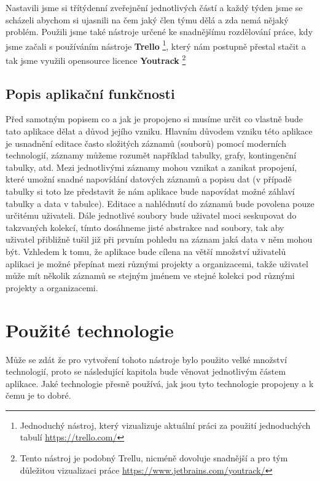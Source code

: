 \par Nastavili jsme si třítýdenní zveřejnění jednotlivých částí a každý týden jsme se scházeli abychom si ujasnili na čem jaký člen týmu dělá a zda nemá nějaký problém. Použili jsme také nástroje určené ke snadnějšímu rozdělování práce, kdy jsme začali s používáním nástroje \textbf{Trello} \footnote{Jednoduchý nástroj, který vizualizuje aktuální práci za použití jednoduchých tabulí \url{https://trello.com/}}, který nám postupně přestal stačit a tak jsme využili opensource licence \textbf{Youtrack} \footnote{Tento nástroj je podobný Trellu, nicméně dovoluje snadnější a pro tým důležitou vizualizaci práce \url{https://www.jetbrains.com/youtrack/}}

\subsection{Popis aplikační funkčnosti}
\par Před samotným popisem co a jak je propojeno si musíme určit co vlastně bude tato aplikace dělat a důvod jejího vzniku. Hlavním důvodem vzniku této aplikace je usnadnění editace často složitých záznamů (souborů) pomocí moderních technologií, záznamy můžeme rozumět například tabulky, grafy, kontingenční tabulky, atd. Mezi jednotlivými záznamy mohou vznikat a zanikat propojení, které umožní snadné napovídání datových záznamů a popisu dat (v případě tabulky si toto lze představit že nám aplikace bude napovídat možné záhlaví tabulky a data v tabulce). Editace a nahlédnutí do záznamů bude povolena pouze určitému uživateli. Dále jednotlivé soubory bude uživatel moci seskupovat do takzvaných kolekcí, tímto dosáhneme jisté abstrakce nad soubory, tak aby uživatel přibližně tušil již při prvním pohledu na záznam jaká data v něm mohou být. Vzhledem k tomu, že aplikace bude cílena na větší množství uživatelů aplikaci je možné přepínat mezi různými projekty a organizacemi, takže uživatel může mít několik záznamů se stejným jménem ve stejné kolekci pod různými projekty a organizacemi.

\section{Použité technologie}
\par Může se zdát že pro vytvoření tohoto nástroje bylo použito velké množství technologií, proto se následující kapitola bude věnovat jednotlivým částem aplikace. Jaké technologie přesně používá, jak jsou tyto technologie propojeny a k čemu je to dobré.

